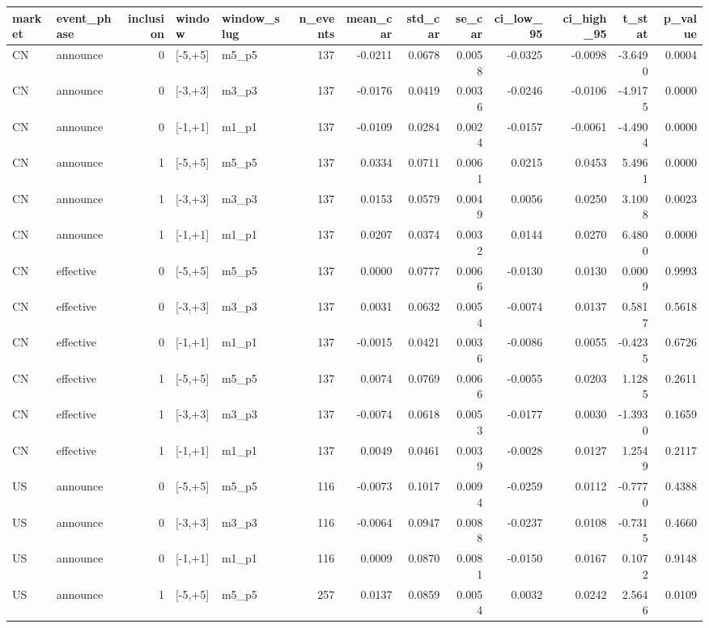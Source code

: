 \begin{tabular}{llrllrrrrrrrr}
\toprule
market & event_phase & inclusion & window & window_slug & n_events & mean_car & std_car & se_car & ci_low_95 & ci_high_95 & t_stat & p_value \\
\midrule
CN & announce & 0 & [-5,+5] & m5_p5 & 137 & -0.0211 & 0.0678 & 0.0058 & -0.0325 & -0.0098 & -3.6490 & 0.0004 \\
CN & announce & 0 & [-3,+3] & m3_p3 & 137 & -0.0176 & 0.0419 & 0.0036 & -0.0246 & -0.0106 & -4.9175 & 0.0000 \\
CN & announce & 0 & [-1,+1] & m1_p1 & 137 & -0.0109 & 0.0284 & 0.0024 & -0.0157 & -0.0061 & -4.4904 & 0.0000 \\
CN & announce & 1 & [-5,+5] & m5_p5 & 137 & 0.0334 & 0.0711 & 0.0061 & 0.0215 & 0.0453 & 5.4961 & 0.0000 \\
CN & announce & 1 & [-3,+3] & m3_p3 & 137 & 0.0153 & 0.0579 & 0.0049 & 0.0056 & 0.0250 & 3.1008 & 0.0023 \\
CN & announce & 1 & [-1,+1] & m1_p1 & 137 & 0.0207 & 0.0374 & 0.0032 & 0.0144 & 0.0270 & 6.4800 & 0.0000 \\
CN & effective & 0 & [-5,+5] & m5_p5 & 137 & 0.0000 & 0.0777 & 0.0066 & -0.0130 & 0.0130 & 0.0009 & 0.9993 \\
CN & effective & 0 & [-3,+3] & m3_p3 & 137 & 0.0031 & 0.0632 & 0.0054 & -0.0074 & 0.0137 & 0.5817 & 0.5618 \\
CN & effective & 0 & [-1,+1] & m1_p1 & 137 & -0.0015 & 0.0421 & 0.0036 & -0.0086 & 0.0055 & -0.4235 & 0.6726 \\
CN & effective & 1 & [-5,+5] & m5_p5 & 137 & 0.0074 & 0.0769 & 0.0066 & -0.0055 & 0.0203 & 1.1285 & 0.2611 \\
CN & effective & 1 & [-3,+3] & m3_p3 & 137 & -0.0074 & 0.0618 & 0.0053 & -0.0177 & 0.0030 & -1.3930 & 0.1659 \\
CN & effective & 1 & [-1,+1] & m1_p1 & 137 & 0.0049 & 0.0461 & 0.0039 & -0.0028 & 0.0127 & 1.2549 & 0.2117 \\
US & announce & 0 & [-5,+5] & m5_p5 & 116 & -0.0073 & 0.1017 & 0.0094 & -0.0259 & 0.0112 & -0.7770 & 0.4388 \\
US & announce & 0 & [-3,+3] & m3_p3 & 116 & -0.0064 & 0.0947 & 0.0088 & -0.0237 & 0.0108 & -0.7315 & 0.4660 \\
US & announce & 0 & [-1,+1] & m1_p1 & 116 & 0.0009 & 0.0870 & 0.0081 & -0.0150 & 0.0167 & 0.1072 & 0.9148 \\
US & announce & 1 & [-5,+5] & m5_p5 & 257 & 0.0137 & 0.0859 & 0.0054 & 0.0032 & 0.0242 & 2.5646 & 0.0109 \\

\end{tabular}
